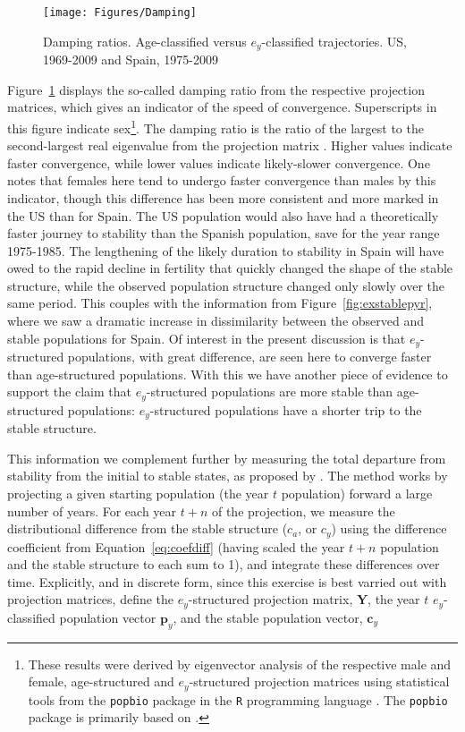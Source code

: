 \begin{figure}[ht!]
       \centering
       \caption{Damping ratios. Age-classified versus $e_y$-classified
       trajectories. US, 1969-2009 and Spain, 1975-2009}
        \texttt{[image: Figures/Damping]}
        \label{fig:damping}
\end{figure}

Figure~\ref{fig:damping} displays the so-called damping ratio from the
respective projection matrices, which gives an indicator of the speed of
convergence. Superscripts in this figure indicate sex\footnote{These results
were derived by eigenvector analysis of the respective male and female, age-structured and
$e_y$-structured projection matrices using statistical tools from the
\texttt{popbio} package \citep{popbio2007} in the
\texttt{R} programming language \citep{Rcitation}. The \texttt{popbio} package
is primarily based on \citet{caswell2001matrix}.}. The damping ratio is the 
ratio of the largest to the second-largest real eigenvalue from the projection 
matrix \citep[p101]{caswell2001matrix}. Higher values indicate faster 
convergence, while lower values indicate likely-slower convergence. One notes 
that females here tend to undergo faster convergence than
males by this indicator, though this difference has been more consistent and
more marked in the US than for Spain. The US population would also have had a
theoretically faster journey to stability than the Spanish population, save for
the year range 1975-1985. The lengthening of the likely duration to stability in
Spain will have owed to the rapid decline in fertility that quickly changed the
shape of the stable structure, while the observed population structure
changed only slowly over the same period. This couples with the information
from Figure~\ref{fig:exstablepyr}, where we saw a dramatic increase in
dissimilarity between the observed and stable populations for Spain. Of interest
in the present discussion is that $e_y$-structured populations, with great difference, 
are seen here to converge faster than age-structured populations. With this we 
have another piece of evidence to support the claim that $e_y$-structured populations are more stable than
age-structured populations: $e_y$-structured populations have a shorter
trip to the stable structure.

This information we complement further by measuring the total departure from
stability from the initial to stable states, as proposed by
\citet{cohen1979cumulative}. The method works by projecting a given starting
population (the year $t$ population) forward a large number of years. For each
year $t+n$ of the projection, we measure the distributional difference from
the stable structure ($c_a$, or $c_y$) using the difference coefficient from
Equation~\ref{eq:coefdiff} (having scaled the year $t+n$ population and the
stable structure to each sum to 1), and integrate these differences over time.
Explicitly, and in discrete form, since this exercise is best varried out with
projection matrices, define the $e_y$-structured projection matrix,
$\textbf{Y}$, the year $t$ $e_y$-classified population vector
$\textbf{p}_y$, and the stable population vector, $\textbf{c}_y$

